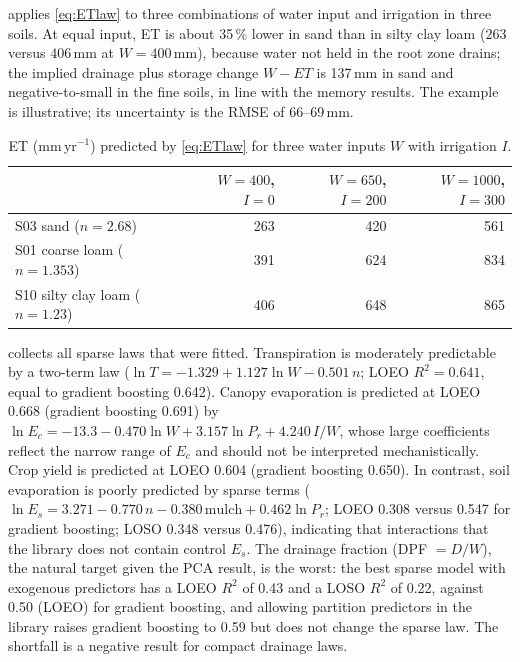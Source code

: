 \documentclass[preprint,12pt,authoryear]{elsarticle}
\begin{document}
 applies \cref{eq:ETlaw} to three combinations of water input and irrigation in three soils. At equal input, ET is about 35\,\% lower in sand than in silty clay loam ($263$ versus $406$\,mm at $W=400$\,mm), because water not held in the root zone drains; the implied drainage plus storage change $W-\mathit{ET}$ is 137\,mm in sand and negative-to-small in the fine soils, in line with the memory results. The example is illustrative; its uncertainty is the RMSE of 66--69\,mm.

\begin{table}[H]\centering\small
\caption{ET (mm\,yr$^{-1}$) predicted by \cref{eq:ETlaw} for three water inputs $W$ with irrigation $I$.}
\label{tab:example}
\begin{tabular}{lrrr}
\toprule
 & $W=400$, $I=0$ & $W=650$, $I=200$ & $W=1000$, $I=300$\\\midrule
S03 sand ($n=2.68$) & 263 & 420 & 561\\
S01 coarse loam ($n=1.353$) & 391 & 624 & 834\\
S10 silty clay loam ($n=1.23$) & 406 & 648 & 865\\\bottomrule
\end{tabular}
\end{table}

\label{sec:failures}
 collects all sparse laws that were fitted. Transpiration is moderately predictable by a two-term law ($\ln T=-1.329+1.127\ln W-0.501\,n$; LOEO $R^2=0.641$, equal to gradient boosting 0.642). Canopy evaporation is predicted at LOEO 0.668 (gradient boosting 0.691) by $\ln E_c=-13.3-0.470\ln W+3.157\ln P_r+4.240\,I/W$, whose large coefficients reflect the narrow range of $E_c$ and should not be interpreted mechanistically. Crop yield is predicted at LOEO 0.604 (gradient boosting 0.650). In contrast, soil evaporation is poorly predicted by sparse terms ($\ln E_s=3.271-0.770\,n-0.380\,\mathrm{mulch}+0.462\ln P_r$; LOEO 0.308 versus 0.547 for gradient boosting; LOSO 0.348 versus 0.476), indicating that interactions that the library does not contain control $E_s$. The drainage fraction (DPF $=D/W$), the natural target given the PCA result, is the worst: the best sparse model with exogenous predictors has a LOEO $R^2$ of 0.43 and a LOSO $R^2$ of 0.22, against 0.50 (LOEO) for gradient boosting, and allowing partition predictors in the library raises gradient boosting to 0.59 but does not change the sparse law. The shortfall is a negative result for compact drainage laws.
\end{document}
